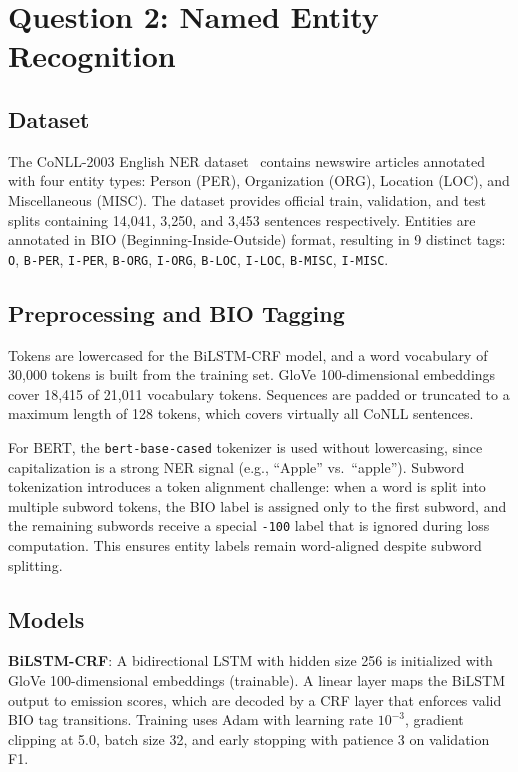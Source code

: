 \documentclass[12pt,a4paper]{article}
\begin{document}
\section{Question 2: Named Entity Recognition}

\subsection{Dataset}

The CoNLL-2003 English NER dataset~\citep{tjong2003conll} contains newswire articles annotated with four entity types: Person (PER), Organization (ORG), Location (LOC), and Miscellaneous (MISC). The dataset provides official train, validation, and test splits containing 14{,}041, 3{,}250, and 3{,}453 sentences respectively. Entities are annotated in BIO (Beginning-Inside-Outside) format, resulting in 9 distinct tags: \texttt{O}, \texttt{B-PER}, \texttt{I-PER}, \texttt{B-ORG}, \texttt{I-ORG}, \texttt{B-LOC}, \texttt{I-LOC}, \texttt{B-MISC}, \texttt{I-MISC}.

\subsection{Preprocessing and BIO Tagging}

Tokens are lowercased for the BiLSTM-CRF model, and a word vocabulary of 30{,}000 tokens is built from the training set. GloVe 100-dimensional embeddings cover 18{,}415 of 21{,}011 vocabulary tokens. Sequences are padded or truncated to a maximum length of 128 tokens, which covers virtually all CoNLL sentences.

For BERT, the \texttt{bert-base-cased} tokenizer is used without lowercasing, since capitalization is a strong NER signal (e.g., ``Apple'' vs.\ ``apple''). Subword tokenization introduces a token alignment challenge: when a word is split into multiple subword tokens, the BIO label is assigned only to the first subword, and the remaining subwords receive a special \texttt{-100} label that is ignored during loss computation. This ensures entity labels remain word-aligned despite subword splitting.

\subsection{Models}

\textbf{BiLSTM-CRF}: A bidirectional LSTM with hidden size 256 is initialized with GloVe 100-dimensional embeddings (trainable). A linear layer maps the BiLSTM output to emission scores, which are decoded by a CRF layer that enforces valid BIO tag transitions. Training uses Adam with learning rate $10^{-3}$, gradient clipping at 5.0, batch size 32, and early stopping with patience 3 on validation F1.
\end{document}
